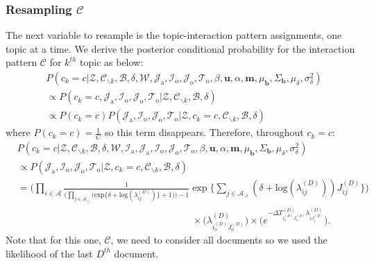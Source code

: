 \documentclass[a4paper]{article}
\begin{document}
      \subsubsection{Resampling $\mathcal{C}$} \label{subsec: Resampling C}
   The next variable to resample is the topic-interaction pattern assignments, one topic at a time. We derive the posterior conditional probability for the interaction pattern $\mathcal{C}$ for $k^{th}$ topic as below:
   \begin{equation}
   \begin{aligned} & P(c_k=c|\mathcal{Z},   \mathcal{C}_{\backslash k},   \mathcal{B},\delta,\mathcal{W}, \mathcal{J}_{\mbox{a}}, \mathcal{I}_{\mbox{o}}, \mathcal{J}_{\mbox{o}}, \mathcal{T}_{\mbox{o}}, \beta, \boldsymbol{u}, \alpha, \boldsymbol{m},  \mu_{\boldsymbol{b}}, \Sigma_{\boldsymbol{b}}, \mu_\delta, \sigma^2_\delta)\\
   &\propto P(c_k=c, \mathcal{J}_{\mbox{a}}, \mathcal{I}_{\mbox{o}}, \mathcal{J}_{\mbox{o}}, \mathcal{T}_{\mbox{o}}|\mathcal{Z}, \mathcal{C}_{\backslash k},   \mathcal{B},\delta)\\
   & \propto P(c_k=c)P(\mathcal{J}_{\mbox{a}}, \mathcal{I}_{\mbox{o}}, \mathcal{J}_{\mbox{o}}, \mathcal{T}_{\mbox{o}}| \mathcal{Z}, c_k=c, \mathcal{C}_{\backslash k}, \mathcal{B}, \delta)
   \end{aligned}
   \end{equation}
   where $P(c_k=c) = \frac{1}{C}$ so this term disappears. Therefore, throughout $c_k=c$:
   \begin{equation}
   \begin{aligned}
   &P(c_k=c|\mathcal{Z},   \mathcal{C}_{\backslash k},   \mathcal{B}, \delta, \mathcal{W}, \mathcal{I}_{\mbox{a}}, \mathcal{J}_{\mbox{a}}, \mathcal{I}_{\mbox{o}}, \mathcal{J}_{\mbox{o}}, \mathcal{T}_{\mbox{o}}, \beta, \boldsymbol{u}, \alpha, \boldsymbol{m},  \mu_{\boldsymbol{b}}, \Sigma_{\boldsymbol{b}}, \mu_\delta, \sigma^2_\delta)\\&\propto P( \mathcal{J}_{\mbox{a}}, \mathcal{I}_{\mbox{o}}, \mathcal{J}_{\mbox{o}}, \mathcal{T}_{\mbox{o}}| \mathcal{Z}, c_k=c, \mathcal{C}_{\backslash k}, \mathcal{B}, \delta)\\&=\Big(\prod_{i\in \mathcal{A}} \frac{1}{\Big(\prod_{j \in \mathcal{A}_{\backslash i}} \Big(\mbox{exp}\{\delta+\mbox{log}(\lambda_{ij}^{(D)})\} + 1\Big)\Big)-1}\exp\Big\{\sum_{j \in \mathcal{A}_{\backslash i}} (\delta+\mbox{log}(\lambda_{ij}^{(D)}))J_{ij}^{(D)} \Big\}\Big)\\&\quad\quad\quad\quad\quad\quad\quad\quad\quad\quad\quad\quad\quad\quad\quad\quad\quad\quad\times \Big(\lambda^{(D)}_{i_o^{(D)}J_{o}^{(D)}}\Big)\times \Big(e^{-\Delta T^{(D)}_{i_o^{(D)}J_o^{(D)}}\lambda^{(D)}_{iJ^{(D)}_{i}}}\Big).
   \end{aligned}
   \end{equation} 
   Note that for this one, $\mathcal{C}$, we need to consider all documents so we used the likelihood of the last $D^{th}$ document.
\end{document}
